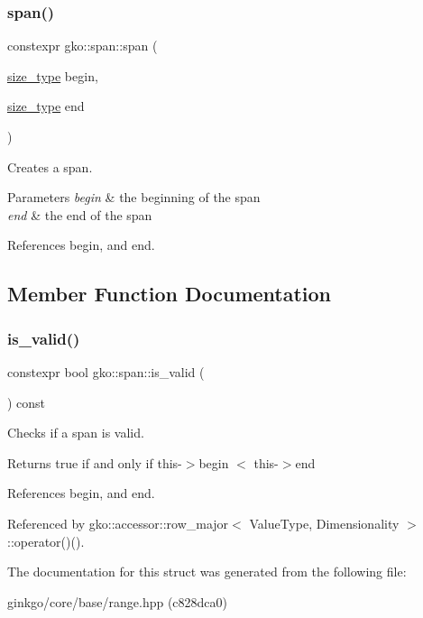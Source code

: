 \subsubsection{\texorpdfstring{span()}{span()}\hspace{0.1cm}{\footnotesize\ttfamily [2/2]}}
{\footnotesize\ttfamily constexpr gko\+::span\+::span (\begin{DoxyParamCaption}\item[{\hyperlink{namespacegko_a6e5c95df0ae4e47aab2f604a22d98ee7}{size\+\_\+type}}]{begin,  }\item[{\hyperlink{namespacegko_a6e5c95df0ae4e47aab2f604a22d98ee7}{size\+\_\+type}}]{end }\end{DoxyParamCaption})\hspace{0.3cm}{\ttfamily [noexcept]}}



Creates a span. 


\begin{DoxyParams}{Parameters}
{\em begin} & the beginning of the span \\
\hline
{\em end} & the end of the span \\
\hline
\end{DoxyParams}


References begin, and end.



\subsection{Member Function Documentation}
\mbox{\label{structgko_1_1span_a32a87f434708e6857820858503f9b133}} 
\subsubsection{\texorpdfstring{is\+\_\+valid()}{is\_valid()}}
{\footnotesize\ttfamily constexpr bool gko\+::span\+::is\+\_\+valid (\begin{DoxyParamCaption}{ }\end{DoxyParamCaption}) const}



Checks if a span is valid. 

\begin{DoxyReturn}{Returns}
true if and only if {\ttfamily this-\/$>$begin $<$ this-\/$>$end} 
\end{DoxyReturn}


References begin, and end.



Referenced by gko\+::accessor\+::row\+\_\+major$<$ Value\+Type, Dimensionality $>$\+::operator()().



The documentation for this struct was generated from the following file\+:\begin{DoxyCompactItemize}
\item 
ginkgo/core/base/range.\+hpp (c828dca0)\end{DoxyCompactItemize}
